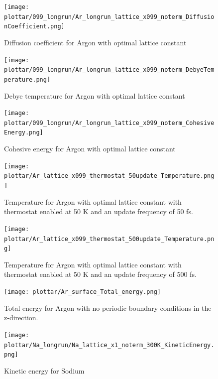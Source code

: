 \documentclass[12pt,a4paper]{article}
\begin{document}
\begin{center}
\newpage
\begin{figure}
	\texttt{[image: plottar/099\_longrun/Ar\_longrun\_lattice\_x099\_noterm\_DiffusionCoefficient.png]}
	\caption{Diffusion coefficient for Argon with optimal lattice constant}
	\label{fig:Ar_DiffusionCoeff}
\end{figure}

\newpage
\begin{figure}
	\texttt{[image: plottar/099\_longrun/Ar\_longrun\_lattice\_x099\_noterm\_DebyeTemperature.png]}
	\caption{Debye temperature for Argon with optimal lattice constant}
	\label{fig:Ar_Debye}
\end{figure}

\newpage
\begin{figure}
	\texttt{[image: plottar/099\_longrun/Ar\_longrun\_lattice\_x099\_noterm\_CohesiveEnergy.png]}
	\caption{Cohesive energy for Argon with optimal lattice constant}
	\label{fig:Ar_Ecoh}
\end{figure}

\newpage
\begin{figure}
	\texttt{[image: plottar/Ar\_lattice\_x099\_thermostat\_50update\_Temperature.png]}
	\caption{Temperature for Argon with optimal lattice constant with thermostat enabled at 50 K and an update frequency of 50 fs.}
	\label{fig:Ar_thermostat50}
\end{figure}

\newpage
\begin{figure}
	\texttt{[image: plottar/Ar\_lattice\_x099\_thermostat\_500update\_Temperature.png]}
	\caption{Temperature for Argon with optimal lattice constant with thermostat enabled at 50 K and an update frequency of 500 fs.}
	\label{fig:Ar_thermostat500}
\end{figure}

\newpage
\begin{figure}
	\texttt{[image: plottar/Ar\_surface\_Total\_energy.png]}
	\caption{Total energy for Argon with no periodic boundary conditions in the z-direction.}
	\label{fig:Ar_surface}
\end{figure}

\newpage
\begin{figure}
	\texttt{[image: plottar/Na\_longrun/Na\_lattice\_x1\_noterm\_300K\_KineticEnergy.png]}
	\caption{Kinetic energy for Sodium}
	\label{fig:Na_Ekin}
\end{figure}


\end{center}
\end{document}
